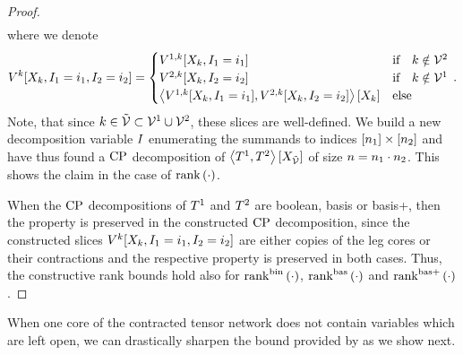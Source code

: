 \begin{proof}
\begin{align*}
    \end{align*}
    where we denote
    \begin{align*}
        V^{k}[X_{k},I_{1}=i_{1},I_{2}=i_{2}]
        = \begin{cases}
              V^{1,k}[X_{k},I_{1}=i_{1}]  & \text{if} \quad k \notin \mathcal{V}^{2} \\
              V^{2,k}[X_{k},I_{2}=i_{2}]  & \text{if} \quad k \notin \mathcal{V}^{1} \\
              \left\langle V^{1,k}[X_{k},I_{1}=i_{1}], V^{2,k}[X_{k},I_{2}=i_{2}]\right\rangle \left[ X_{k} \right]  & \text{else}
        \end{cases} \, .
    \end{align*}
    Note, that since $k\in\tilde{\mathcal{V}}\subset\mathcal{V}^{1}\cup\mathcal{V}^{2}$, these slices are well-defined.
    We build a new decomposition variable $I$ enumerating the summands to indices $[n_{1}]\times[n_{2}]$ and have thus found a $\mathrm{CP}$ decomposition of $\left\langle T^{1},T^{2}\right\rangle \left[ X_{\tilde{\mathcal{V}}} \right]$ of size $n=n_{1}\cdot n_{2}$.
    This shows the claim in the case of $\mathrm{rank}\left(\cdot\right)$.

    When the $\mathrm{CP}$ decompositions of $T^{1}$ and $T^{2}$ are boolean, basis or basis+, then the property is preserved in the constructed $\mathrm{CP}$ decomposition, since the constructed slices $V^{k}[X_{k},I_{1}=i_{1},I_{2}=i_{2}]$ are either copies of the leg cores or their contractions and the respective property is preserved in both cases.
    Thus, the constructive rank bounds hold also for $\mathrm{rank}^{\mathrm{bin}}\left(\cdot\right)$, $\mathrm{rank}^{\mathrm{bas}}\left(\cdot\right)$ and $\mathrm{rank}^{\mathrm{bas+}}\left(\cdot\right)$.
\end{proof}

When one core of the contracted tensor network does not contain variables which are left open, we can drastically sharpen the bound provided by  as we show next.

